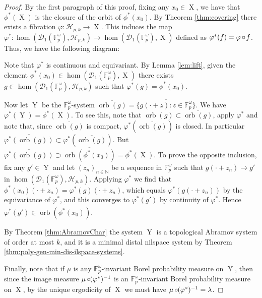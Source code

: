 \documentclass[a4paper,12pt,reqno]{amsart}
\theoremstyle{definition}
\newcommand{\mc}{\mathcal}
\newcommand{\mb}{\mathbb}
\DeclareMathOperator{\ns}{X}
\DeclareMathOperator{\nss}{Y}
\DeclareMathOperator{\co}{\circ\hspace{-0.02 cm}}
\DeclareMathOperator{\orb}{orb}
\begin{document}
\begin{proof}
By the first paragraph of this proof, fixing any  $x_0\in \ns$, we have that $\phi^*(\ns)$ is the closure of the orbit of $\phi^*(x_0)$. By Theorem \ref{thm:covering} there exists a fibration $\varphi:\mc{H}_{p,k}\to \ns$. This induces the map $\varphi^*:\hom(\mc{D}_1(\mb{F}_p^\omega),\mc{H}_{p,k}) \to \hom(\mc{D}_1(\mb{F}_p^\omega),\ns)$ defined as $\varphi^*(f) = \varphi\co f$. Thus, we have the following diagram:
\begin{center}
\end{center}
Note that $\varphi^*$ is continuous and equivariant. By Lemma \ref{lem:lift}, given the element $\phi^*(x_0)\in \hom(\mc{D}_1(\mb{F}_p^\omega),\ns)$ there exists $g\in \hom(\mc{D}_1(\mb{F}_p^\omega),\mc{H}_{p,k})$ such that $\varphi^*(g)=\phi^*(x_0)$.

Now let $\nss$ be the $\mb{F}_p^\omega$-system $\overline{\orb(g)}=\overline{\{g(\cdot+z):z\in \mb{F}_p^\omega\}}$. We have $\varphi^*(\nss)=\phi^*(\ns)$. To see this, note that $\orb(g)\subset \overline{\orb(g)}$, apply $\varphi^*$ and note that, since $\overline{\orb(g)}$ is compact, $\varphi^*(\overline{\orb(g)})$ is closed. In particular $\overline{\varphi^*(\orb(g))}\subset \varphi^*(\overline{\orb(g)})$. But $\overline{\varphi^*(\orb(g))}\supset \overline{\orb(\phi^*(x_0))}=\phi^*(\ns)$. To prove the opposite inclusion, fix any $g'\in \nss$ and let $(z_n)_{n\in \mb{N}}$ be a sequence in $\mb{F}_p^\omega$ such that $g(\cdot+z_n)\to g'$ in $\hom(\mc{D}_1(\mb{F}_p^\omega),\mc{H}_{p,k})$. Applying $\varphi^*$ we find that $\phi^*(x_0)(\cdot+z_n) = \varphi^*(g)(\cdot+z_n)$, which  equals $\varphi^*(g(\cdot+z_n))$ by the equivariance of $\varphi^*$, and this converges to $\varphi^*(g')$ by continuity of $\varphi^*$. Hence $\varphi^*(g')\in \overline{\orb(\phi^*(x_0))}$.

By Theorem \ref{thm:AbramovChar} the system  $\nss$ is a topological Abramov system of order at most $k$, and it is a minimal distal nilspace system by Theorem \ref{thm:poly-gen-min-dis-ilspace-systems}. 

Finally, note that if $\mu$ is any $\mb{F}_p^\omega$-invariant Borel probability measure on $\nss$, then since the image measure $\mu\co(\varphi^*)^{-1}$ is an $\mb{F}_p^\omega$-invariant Borel probability measure on $\ns$, by the unique ergodicity of $\ns$ we must have $\mu\co(\varphi^*)^{-1}=\lambda$.
\end{proof}
\end{document}
